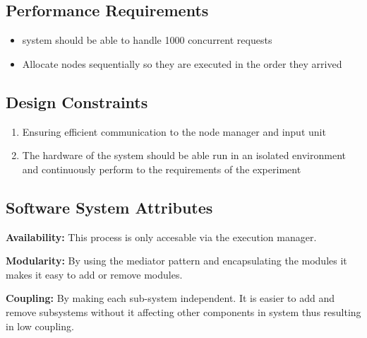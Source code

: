 \subsection{Performance Requirements}
\begin{itemize}
	\item system should be able to handle 1000 concurrent requests 
	\item Allocate nodes sequentially so they are executed in the order they arrived
\end{itemize}
\subsection{Design Constraints}
\begin{enumerate}
	\item Ensuring efficient communication to the node manager and input unit
	
	\item The hardware of the system should be able run in an isolated environment and continuously perform to the requirements of the experiment 
\end{enumerate}
\subsection{Software System Attributes}
{ 
    \begin{flushleft}
    \par\textbf{Availability: }This process is only accesable via the execution manager.\newline
    
    \par\textbf{Modularity: }By using the mediator pattern and encapsulating the modules it makes it easy to add or remove modules.\newline
  
    \par\textbf{Coupling: }By making each sub-system independent. It is easier to add and remove subsystems without it affecting other components in system thus resulting in low coupling. \newline
    \end{flushleft}
    
}


